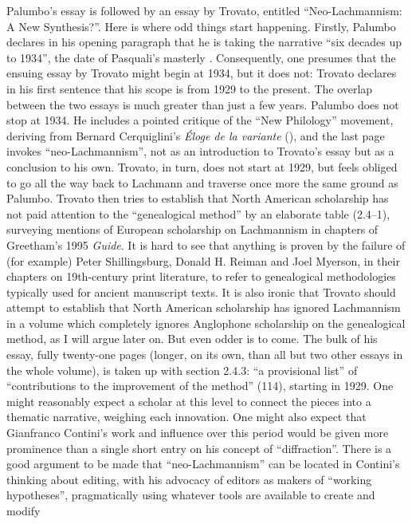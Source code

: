 \begin{review}
Palumbo's essay is followed by an essay by Trovato, entitled
``Neo-Lachmannism: A New Synthesis?''. Here is where odd things start
happening. Firstly, Palumbo declares in his opening paragraph that he is
taking the narrative ``six decades up to 1934'', the date of Pasquali's
masterly .
Consequently, one presumes that the ensuing essay by Trovato might begin
at 1934, but it does not: Trovato declares in his first sentence that
his scope is from 1929 to the present. The overlap between the two
essays is much greater than just a few years. Palumbo does not stop at
1934. He includes a pointed critique of the ``New Philology'' movement,
deriving from Bernard Cerquiglini's \emph{Éloge de la variante} (\citeyear{cerquiglini_eloge_1989}),
and the last page invokes ``neo-Lachmannism'', not as an introduction to
Trovato's essay but as a conclusion to his own. Trovato, in turn, does
not start at 1929, but feels obliged to go all the way back to Lachmann
and traverse once more the same ground as Palumbo. Trovato then tries to
establish that North American scholarship has not paid attention to the
``genealogical method'' by an elaborate table (2.4--1), surveying
mentions of European scholarship on Lachmannism in chapters of
Greetham's 1995 \emph{Guide}. It is hard to see that anything is proven
by the failure of (for example) Peter Shillingsburg, Donald H. Reiman
and Joel Myerson, in their chapters on 19th-century print literature, to
refer to genealogical methodologies typically used for ancient
manuscript texts. It is also ironic that Trovato should attempt to
establish that North American scholarship has ignored Lachmannism in a
volume which completely ignores Anglophone scholarship on the
genealogical method, as I will argue later on. But even odder is to
come. The bulk of his essay, fully twenty-one pages (longer, on its own,
than all but two other essays in the whole volume), is taken up with
section 2.4.3: ``a provisional list'' of ``contributions to the
improvement of the method'' (114), starting in 1929. One might
reasonably expect a scholar at this level to connect the pieces into a
thematic narrative, weighing each innovation. One might also expect that
Gianfranco Contini's work and influence over this period would be given
more prominence than a single short entry on his concept of
``diffraction''. There is a good argument to be made that
``neo-Lachmannism'' can be located in Contini's thinking about editing,
with his advocacy of editors as makers of ``working hypotheses'',
pragmatically using whatever tools are available to create and modify

\end{review}

